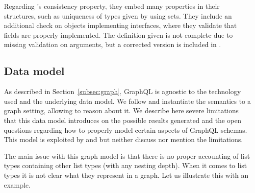 
Regarding \HP{}'s consistency property, they embed many properties in their structures, such as uniqueness of types given by using sets. They include an additional check on objects implementing interfaces, where they validate that fields are properly implemented. The definition given is not complete due to missing validation on arguments, but a corrected version is included in \cite{olafschema}.

\subsection{Data model}

As described in Section~\ref{subsec:graph}, GraphQL is agnostic to the technology used and the underlying data model. We follow \HP{} and instantiate the semantics to a graph setting, allowing to reason about it. We describe here severe limitations that this data model introduces on the possible results generated and the open questions regarding how to properly model certain aspects of GraphQL schemas. This model is exploited by \HP{} and \cite{olafschema} but neither discuss nor mention the limitations.

The main issue with this graph model is that there is no proper accounting of list types containing other list types (with any nesting depth). When it comes to list types it is not clear what they represent in a graph. Let us illustrate this with an example.



